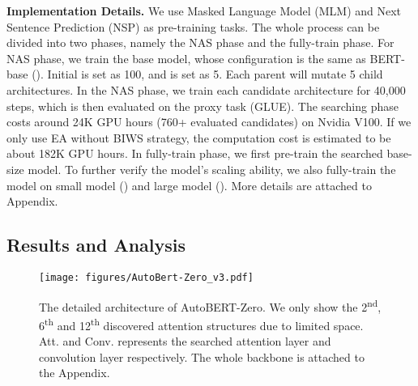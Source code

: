 \documentclass[letterpaper]{article} \usepackage{aaai22}  \usepackage{times}  \usepackage{helvet}  \usepackage{courier}  \usepackage[hyphens]{url}  \usepackage{graphicx} \urlstyle{rm} \def\UrlFont{\rm}  \usepackage{natbib}  \usepackage{caption} \DeclareCaptionStyle{ruled}{labelfont=normalfont,labelsep=colon,strut=off} \frenchspacing  \setlength{\pdfpagewidth}{8.5in}  \setlength{\pdfpageheight}{11in}  \usepackage{algorithm}
\begin{document}
\textbf{Implementation Details.} 
We use Masked Language Model (MLM) and Next Sentence Prediction (NSP) as pre-training tasks.
The whole process can be divided into two phases, namely the NAS phase and the fully-train phase. For NAS phase, we train the base model, whose configuration is the same as BERT-base ().
Initial {} is set as 100, and  is set as 5.
Each parent will mutate 5 child architectures. In the NAS phase, we train each candidate architecture for 40,000 steps, which is then evaluated on the proxy task (GLUE).
The searching phase costs around 24K GPU hours (760+ evaluated candidates) on Nvidia V100. If we only use EA without BIWS strategy, the computation cost is estimated to be about 182K GPU hours. 
In fully-train phase, we first pre-train the searched base-size model. To further verify the model’s scaling ability, we also fully-train the model on small model () and large model ().
More details are attached to Appendix. 

\subsection{Results and Analysis}\label{sec:analysis}
\begin{figure}[t]
\centering
 	\vspace{-5mm}
	\texttt{[image: figures/AutoBert-Zero\_v3.pdf]}
	\vspace{-6mm}
	\caption{The detailed architecture of AutoBERT-Zero. We only show the 2\textsuperscript{nd}, 6\textsuperscript{th} and 12\textsuperscript{th} discovered attention structures due to limited space. Att. and Conv. represents the searched attention layer and convolution layer respectively. The whole backbone is attached to the Appendix.
	}
	\label{fig:autobert-zero}
\vspace{-5mm}
\end{figure}
\end{document}
